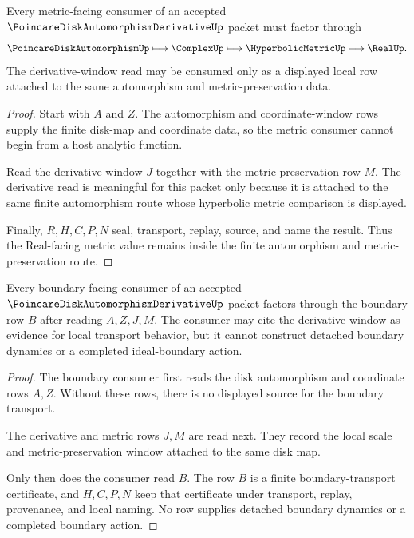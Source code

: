 \begin{theorem}
\label{thm:poincare-disk-automorphism-derivative-metric-preservation}
Every metric-facing consumer of an accepted $\PoincareDiskAutomorphismDerivativeUp$ packet must factor through
$$
\PoincareDiskAutomorphismUp
\longmapsto
\ComplexUp
\longmapsto
\HyperbolicMetricUp
\longmapsto
\RealUp .
$$
The derivative-window read may be consumed only as a displayed local row attached to the same automorphism and metric-preservation data.
\end{theorem}
\begin{proof}
Start with $A$ and $Z$. The automorphism and coordinate-window rows supply the finite disk-map and coordinate data, so the metric consumer cannot begin from a host analytic function.

Read the derivative window $J$ together with the metric preservation row $M$. The derivative read is meaningful for this packet only because it is attached to the same finite automorphism route whose hyperbolic metric comparison is displayed.

Finally, $R,H,C,P,N$ seal, transport, replay, source, and name the result. Thus the Real-facing metric value remains inside the finite automorphism and metric-preservation route.
\end{proof}

\begin{theorem}
\label{thm:poincare-disk-automorphism-derivative-boundary-transport}
Every boundary-facing consumer of an accepted $\PoincareDiskAutomorphismDerivativeUp$ packet factors through the boundary row $B$ after reading $A,Z,J,M$. The consumer may cite the derivative window as evidence for local transport behavior, but it cannot construct detached boundary dynamics or a completed ideal-boundary action.
\end{theorem}
\begin{proof}
The boundary consumer first reads the disk automorphism and coordinate rows $A,Z$. Without these rows, there is no displayed source for the boundary transport.

The derivative and metric rows $J,M$ are read next. They record the local scale and metric-preservation window attached to the same disk map.

Only then does the consumer read $B$. The row $B$ is a finite boundary-transport certificate, and $H,C,P,N$ keep that certificate under transport, replay, provenance, and local naming. No row supplies detached boundary dynamics or a completed boundary action.
\end{proof}

